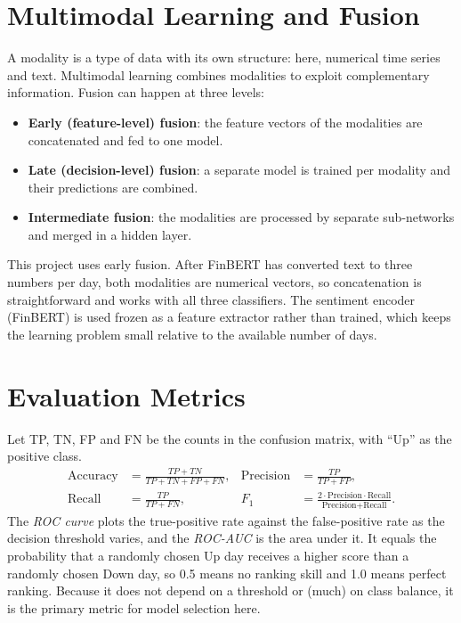 \section{Multimodal Learning and Fusion}
A modality is a type of data with its own structure: here, numerical time series and text. Multimodal learning combines modalities to exploit complementary information. Fusion can happen at three levels:
\begin{itemize}
  \item \textbf{Early (feature-level) fusion}: the feature vectors of the modalities are concatenated and fed to one model.
  \item \textbf{Late (decision-level) fusion}: a separate model is trained per modality and their predictions are combined.
  \item \textbf{Intermediate fusion}: the modalities are processed by separate sub-networks and merged in a hidden layer.
\end{itemize}
This project uses early fusion. After FinBERT has converted text to three numbers per day, both modalities are numerical vectors, so concatenation is straightforward and works with all three classifiers. The sentiment encoder (FinBERT) is used frozen as a feature extractor rather than trained, which keeps the learning problem small relative to the available number of days.

\section{Evaluation Metrics}
Let TP, TN, FP and FN be the counts in the confusion matrix, with ``Up'' as the positive class.
\begin{align}
\text{Accuracy} &= \frac{TP+TN}{TP+TN+FP+FN}, &
\text{Precision} &= \frac{TP}{TP+FP},\\
\text{Recall} &= \frac{TP}{TP+FN}, &
F_1 &= \frac{2\cdot \text{Precision}\cdot\text{Recall}}{\text{Precision}+\text{Recall}}.
\end{align}
The \emph{ROC curve} plots the true-positive rate against the false-positive rate as the decision threshold varies, and the \emph{ROC-AUC} is the area under it. It equals the probability that a randomly chosen Up day receives a higher score than a randomly chosen Down day, so 0.5 means no ranking skill and 1.0 means perfect ranking. Because it does not depend on a threshold or (much) on class balance, it is the primary metric for model selection here.

